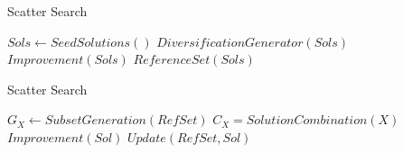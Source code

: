 \begin{algorithm}
  \caption{Scatter Search} \label{alg:SSInitial}
  \begin{algorithmic}
    \State $Sols \gets SeedSolutions()$
    \Repeat
    \State $DiversificationGenerator(Sols)$
    \State $Improvement(Sols)$
    \State $ReferenceSet(Sols)$
    \EndProcedure
  \end{algorithmic}
\end{algorithm}

\begin{algorithm}
  \caption{Scatter Search} \label{alg:SSPhase}
  \begin{algorithmic}
    \Repeat
    \State $G_X \gets SubsetGeneration(RefSet)$
    \State $C_X = SolutionCombination(X)$
    \State $Improvement(Sol)$
    \State $Update(RefSet,Sol)$
    \EndFor
    \EndFor
    \EndProcedure
  \end{algorithmic}
\end{algorithm}
